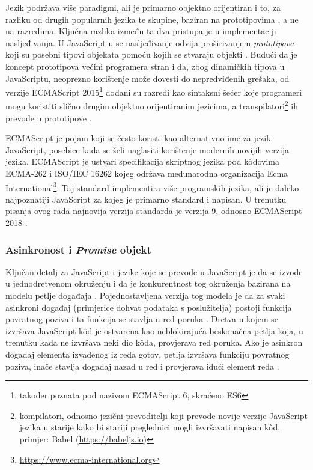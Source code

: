 \documentclass[times, utf8, diplomski, numeric]{fer}
\newcommand{\razmakp}{\vspace{18pt}}
\newcommand{\razmaks}{\vspace{10pt}}
\begin{document}
Jezik podržava više paradigmi, ali je primarno objektno orijentiran i to, za razliku od drugih popularnih jezika te skupine, baziran na prototipovima , a ne na razredima.
Ključna razlika između ta dva pristupa je u implementaciji nasljeđivanja. U JavaScript-u se nasljeđivanje odvija proširivanjem \emph{prototipova} koji su posebni tipovi objekata pomoću kojih se stvaraju objekti \citep{wiki_proto_prog}.
Budući da je koncept prototipova većini programera stran i da, zbog dinamičkih tipova u JavaScriptu, neoprezno korištenje može dovesti do nepredviđenih grešaka, od verzije ECMAScript 2015\footnote{
    također poznata pod nazivom ECMAScript 6, skraćeno ES6
} dodani su razredi kao sintaksni šećer  koje programeri mogu koristiti slično drugim objektno orijentiranim jezicima, a transpilatori\footnote{
    kompilatori, odnosno jezični prevoditelji koji prevode novije verzije JavaScript jezika u starije kako bi stariji preglednici mogli izvršavati napisan kôd, primjer: Babel (\url{https://babeljs.io})
} ih prevode u prototipove \citep{mdn_class}.

\razmakp

ECMAScript je pojam koji se često koristi kao alternativno ime za jezik JavaScript, posebice kada se želi naglasiti korištenje modernih novijih verzija jezika.
ECMAScript je ustvari specifikacija skriptnog jezika pod kôdovima ECMA-262 i ISO/IEC 16262 kojeg održava međunarodna organizacija Ecma International\footnote{\url{https://www.ecma-international.org}}.
Taj standard implementira više programskih jezika, ali je daleko najpoznatiji JavaScript za kojeg je primarno standard i napisan.
U trenutku pisanja ovog rada najnovija verzija standarda je verzija 9, odnosno ECMAScript 2018 \citep{wiki_es}.

\razmaks
\subsubsection{Asinkronost i \emph{Promise} objekt} \label{sec:async}

Ključan detalj za JavaScript i jezike koje se prevode u JavaScript je da se izvode u jednodretvenom okruženju i da je konkurentnost tog okruženja bazirana na modelu petlje događaja .
Pojednostavljena verzija tog modela je da za svaki asinkroni događaj (primjerice dohvat podataka s poslužitelja) postoji funkcija povratnog poziva  i ta funkcija se stavlja u red poruka .
Dretva u kojem se izvršava JavaScript kôd je ostvarena kao neblokirajuća beskonačna petlja koja, u trenutku kada ne izvršava neki dio kôda, provjerava red poruka.
Ako je asinkron događaj elementa izvađenog iz reda gotov, petlja izvršava funkciju povratnog poziva, inače stavlja događaj nazad u red i provjerava idući element reda \citep{mdn_event_loop}.
\end{document}
